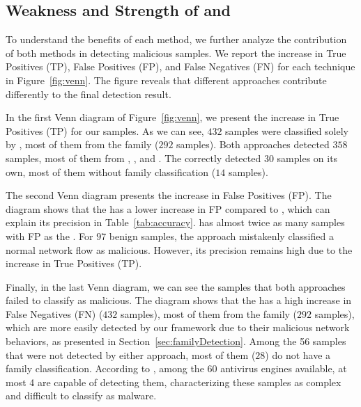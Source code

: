 \subsection{Weakness and Strength of \net and \mas}\label{sec:strategy}

To understand the benefits of each method, we further analyze the contribution of both methods in detecting malicious samples. We report the increase in True Positives (TP), False Positives (FP), and False Negatives (FN) for each technique in Figure~\ref{fig:venn}. The figure reveals that different approaches contribute differently to the final detection result.

In the first Venn diagram of Figure~\ref{fig:venn}, we present the increase in True Positives (TP) for our samples. As we can see, $432$ samples were classified solely by \droidxpflow, most of them from the \gps family ($292$ samples). Both approaches detected $358$ samples, most of them from \gps, , and \dwg. The \mas correctly detected $30$ samples on its own, most of them without family classification ($14$ samples).

The second Venn diagram presents the increase in False Positives (FP). The diagram shows that the \mas has a lower increase in FP compared to \droidxpflow, which can explain its precision in Table~\ref{tab:accuracy}. \droidxpflow has almost twice as many samples with FP as the \mas. For $97$ benign samples, the approach mistakenly classified a normal network flow as malicious. However, its precision remains high due to the increase in True Positives (TP).

Finally, in the last Venn diagram, we can see the samples that both approaches failed to classify as malicious. The diagram shows that the \mas has a high increase in False Negatives (FN) ($432$ samples), most of them from the \gps family ($292$ samples), which are more easily detected by our framework due to their malicious network behaviors, as presented in Section~\ref{sec:familyDetection}. Among the 56 samples that were not detected by either approach, most of them ($28$) do not have a family classification. According to \vt, among the 60 antivirus engines available, at most 4 are capable of detecting them, characterizing these samples as complex and difficult to classify as malware.


